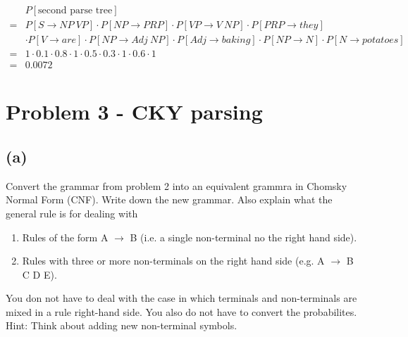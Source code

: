\documentclass[twoside,11pt]{homework}
\begin{document}
\begin{solution}
  \[
    \begin{aligned}
        &P[\text{second parse tree}]\\
      = &P[S \rightarrow NP\ VP] \cdot P[NP \rightarrow PRP] \cdot P[VP \rightarrow V\ NP] \cdot P[PRP \rightarrow they]\\
        &\cdot P[V \rightarrow are] \cdot P[NP \rightarrow Adj\ NP] \cdot P[Adj \rightarrow baking] \cdot P[NP \rightarrow N] \cdot P[N \rightarrow potatoes]\\
      = &1 \cdot 0.1 \cdot 0.8 \cdot 1 \cdot 0.5 \cdot 0.3 \cdot 1 \cdot 0.6 \cdot 1\\
      = &0.0072
    \end{aligned}
  \]

\end{solution}

\section*{Problem 3 - CKY parsing}
\subsection*{(a)}

\begin{prob}
  Convert the grammar from problem 2 into an equivalent grammra in Chomsky
  Normal Form (CNF).
  Write down the new grammar.
  Also explain what the general rule is for dealing with
  \begin{enumerate}
  \item Rules of the form A $\rightarrow$ B (i.e. a single non-terminal no the right hand side).
  \item Rules with three or more non-terminals on the right hand side (e.g. A $\rightarrow$
    B C D E).
  \end{enumerate}

  You don not have to deal with the case in which terminals and non-terminals
  are mixed in a rule right-hand side.
  You also do not have to convert the probabilites.
  Hint: Think about adding new non-terminal symbols.
\end{prob}
\end{document}
